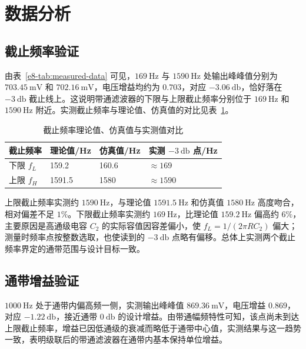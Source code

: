\section{数据分析}

\subsection{截止频率验证}

由表~\ref{e8-tab:measured-data} 可见，$\SI{169}{\hertz}$ 与 $\SI{1590}{\hertz}$ 处输出峰峰值分别为 $\SI{703.45}{\milli\volt}$ 和 $\SI{702.16}{\milli\volt}$，电压增益均约为 $0.703$，对应 $-\SI{3.06}{\decibel}$，恰好落在 $-\SI{3}{\decibel}$ 截止线上。这说明带通滤波器的下限与上限截止频率分别位于 $\SI{169}{\hertz}$ 和 $\SI{1590}{\hertz}$ 附近。实测截止频率与理论值、仿真值的对比见表~\ref{e8-tab:fc-comparison}。

\begin{table}[H]
    \centering
    \caption{截止频率理论值、仿真值与实测值对比}
    \label{e8-tab:fc-comparison}
    \begin{tabular}{llll}
        \toprule
        截止频率 & 理论值/Hz & 仿真值/Hz & 实测 $-\SI{3}{\decibel}$ 点/Hz \\
        \midrule
        下限 $f_L$ & 159.2  & 160.6 & $\approx 169$ \\
        上限 $f_H$ & 1591.5 & 1580  & $\approx 1590$ \\
        \bottomrule
    \end{tabular}
\end{table}

上限截止频率实测约 $\SI{1590}{\hertz}$，与理论值 $\SI{1591.5}{\hertz}$ 和仿真值 $\SI{1580}{\hertz}$ 高度吻合，相对偏差不足 $1\%$。下限截止频率实测约 $\SI{169}{\hertz}$，比理论值 $\SI{159.2}{\hertz}$ 偏高约 $6\%$，主要原因是高通级电容 $C_2$ 的实际容值因容差偏小，使 $f_L = 1/(2\pi RC_2)$ 偏大；测量时频率点按整数选取，也使读到的 $-\SI{3}{\decibel}$ 点略有偏移。总体上实测两个截止频率界定的通带范围与设计目标一致。

\subsection{通带增益验证}

$\SI{1000}{\hertz}$ 处于通带内偏高频一侧，实测输出峰峰值 $\SI{869.36}{\milli\volt}$，电压增益 $0.869$，对应 $-\SI{1.22}{\decibel}$，接近通带 $\SI{0}{\decibel}$ 的设计增益。由带通幅频特性可知，该点尚未到达上限截止频率，增益已因低通级的衰减而略低于通带中心值，实测结果与这一趋势一致，表明级联后的带通滤波器在通带内基本保持单位增益。

